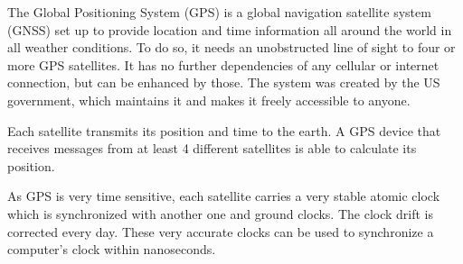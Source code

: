 The Global Positioning System (GPS) is a global navigation satellite system (GNSS) set up to provide location and time information all around the world in all weather conditions. To do so, it needs an unobstructed line of sight to four or more GPS satellites. It has no further dependencies of any cellular or internet connection, but can be enhanced by those. The system was created by the US government, which maintains it and makes it freely accessible to anyone.

Each satellite transmits its position and time to the earth. A GPS device that receives messages from at least 4 different satellites is able to calculate its position.

As GPS is very time sensitive, each satellite carries a very stable atomic clock which is synchronized with another one and ground clocks. The clock drift is corrected every day.
These very accurate clocks can be used to synchronize a computer’s clock within nanoseconds.

